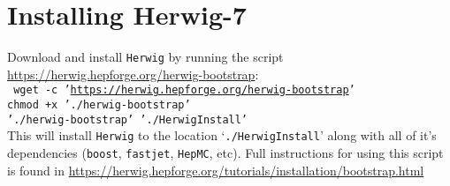 \section{Installing Herwig-7}

Download and install {\tt Herwig} by running the script \url{https://herwig.hepforge.org/herwig-bootstrap}:\\
{\tt
wget -c '\url{https://herwig.hepforge.org/herwig-bootstrap}'\\
chmod +x './herwig-bootstrap'\\
'./herwig-bootstrap' './HerwigInstall'
}\\
This will install {\tt Herwig} to the location `{\tt ./HerwigInstall}' along with all of it's dependencies ({\tt boost}, {\tt fastjet}, {\tt HepMC}, etc). Full instructions for using this script is found in \url{https://herwig.hepforge.org/tutorials/installation/bootstrap.html}
